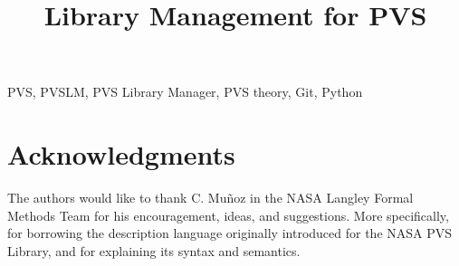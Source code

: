 \documentclass[journal,comsoc]{IEEEtran}
\begin{document}

\title{Library Management for PVS}


\author{
}

\maketitle



\begin{IEEEkeywords}
PVS, PVSLM, PVS Library Manager, PVS theory, Git, Python
\end{IEEEkeywords}

\IEEEpeerreviewmaketitle













\section*{Acknowledgments}
The authors would like to thank C. Mu\~noz in the NASA Langley Formal
Methods Team for his encouragement, ideas, and suggestions. More
specifically, for borrowing the description language originally
introduced for the NASA PVS Library, and for explaining its syntax and
semantics.

\ifCLASSOPTIONcaptionsoff
  \newpage
\fi



\end{document}
